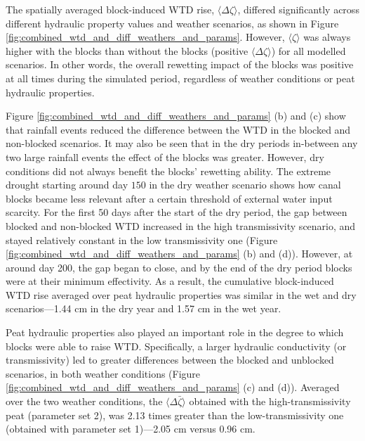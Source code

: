 \documentclass[bg, manuscript]{copernicus}
\begin{document}
The spatially averaged block-induced WTD rise, $\langle \Delta \zeta \rangle$, differed significantly across different hydraulic property values and weather scenarios, as shown in Figure \ref{fig:combined_wtd_and_diff_weathers_and_params}.
However, $\langle \zeta \rangle$ was always higher with the blocks than without the blocks (positive $\langle \Delta \zeta \rangle$) for all modelled scenarios.
In other words, the overall rewetting impact of the blocks was positive at all times during the simulated period, regardless of weather conditions or peat hydraulic properties. 

Figure \ref{fig:combined_wtd_and_diff_weathers_and_params} (b) and (c) show that rainfall events reduced the difference between the WTD in the blocked and non-blocked scenarios.
It may also be seen that in the dry periods in-between any two large rainfall events the effect of the blocks was greater.
However, dry conditions did not always benefit the blocks' rewetting ability.
The extreme drought starting around day $150$ in the dry weather scenario shows how canal blocks became less relevant after a certain threshold of external water input scarcity.
For the first 50 days after the start of the dry period, the gap between blocked and non-blocked WTD increased in the high transmissivity scenario, and stayed relatively constant  in the low transmissivity one (Figure \ref{fig:combined_wtd_and_diff_weathers_and_params} (b) and (d)).
However, at around day 200, the gap began to close, and by the end of the dry period blocks were at their minimum effectivity.
As a result, the cumulative block-induced WTD rise averaged over peat hydraulic properties was similar in the wet and dry scenarios---1.44 \unit{cm} in the dry year and 1.57 \unit{cm} in the wet year.

Peat hydraulic properties also played an important role in the degree to which blocks were able to raise WTD.
Specifically, a larger hydraulic conductivity (or transmissivity) led to greater differences between the blocked and unblocked scenarios, in both weather conditions (Figure \ref{fig:combined_wtd_and_diff_weathers_and_params} (c) and (d)).
Averaged over the two weather conditions, the $\langle \Delta \bar{\zeta}\rangle$ obtained with the high-transmissivity peat (parameter set 2), was 2.13 times greater than the low-transmissivity one (obtained with parameter set 1)---2.05 \unit{cm} versus 0.96 \unit{cm}.
\end{document}

